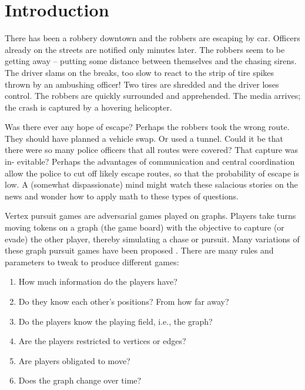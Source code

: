 \chapter{Introduction}\label{chapter intro}
There has been a robbery downtown and the robbers are escaping by car. Officers already on the streets are notified only minutes later. The robbers seem to be getting away – putting some distance between themselves and the chasing sirens. The
driver slams on the breaks, too slow to react to the strip of tire spikes thrown by an
ambushing officer! Two tires are shredded and the driver loses control. The robbers
are quickly surrounded and apprehended. The media arrives; the crash is captured by a hovering helicopter.

Was there ever any hope of escape? Perhaps the robbers took the wrong route. They should have planned a vehicle swap. Or used a tunnel. Could it be that there were so many police officers that all routes were covered? That capture was in-
evitable? Perhaps the advantages of communication and central coordination allow the police to cut off likely escape routes, so that the probability of escape is low. A (somewhat dispassionate) mind might watch these salacious stories on the
news and wonder how to apply math to these types of questions.

Vertex pursuit games are adversarial games played on graphs.
Players take turns moving tokens on a graph (the game board) with
the objective to capture (or evade) the other player, thereby simulating a chase or pursuit.
Many variations of these graph pursuit games have been proposed \cite{bonato2017graph, bellman1967graphs}. There are many rules and parameters to tweak to produce different games:

\begin{enumerate}
\item How much information do the players have?
\item Do they know each other's positions? From how far away?
\item Do the players know the playing field, i.e., the graph?
\item Are the players restricted to vertices or edges?
\item Are players obligated to move?
\item Does the graph change over time?
\end{enumerate}

